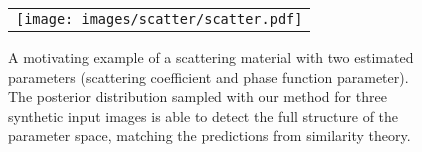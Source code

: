 \begin{figure}[t]
	\centering
	\addtolength{\tabcolsep}{-3pt}
	\begin{tabular}{c}
		\texttt{[image: images/scatter/scatter.pdf]}
	\end{tabular}
	\caption{\label{fig:scatter}
		A motivating example of a scattering material with two estimated parameters (scattering coefficient and phase function parameter). The posterior distribution sampled with our method for three synthetic input images is able to detect the full structure of the parameter space, matching the predictions from similarity theory.
	}
\end{figure}

